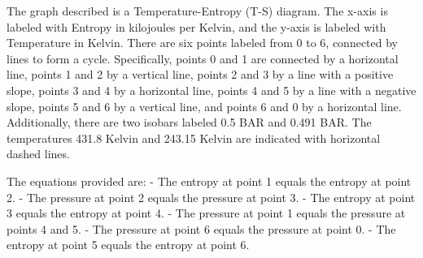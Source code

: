 The graph described is a Temperature-Entropy (T-S) diagram. The x-axis is labeled with Entropy in kilojoules per Kelvin, and the y-axis is labeled with Temperature in Kelvin. There are six points labeled from 0 to 6, connected by lines to form a cycle. Specifically, points 0 and 1 are connected by a horizontal line, points 1 and 2 by a vertical line, points 2 and 3 by a line with a positive slope, points 3 and 4 by a horizontal line, points 4 and 5 by a line with a negative slope, points 5 and 6 by a vertical line, and points 6 and 0 by a horizontal line. Additionally, there are two isobars labeled 0.5 BAR and 0.491 BAR. The temperatures 431.8 Kelvin and 243.15 Kelvin are indicated with horizontal dashed lines.

The equations provided are:
- The entropy at point 1 equals the entropy at point 2.
- The pressure at point 2 equals the pressure at point 3.
- The entropy at point 3 equals the entropy at point 4.
- The pressure at point 1 equals the pressure at points 4 and 5.
- The pressure at point 6 equals the pressure at point 0.
- The entropy at point 5 equals the entropy at point 6.
